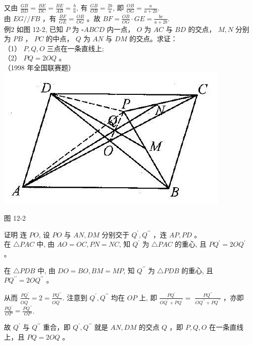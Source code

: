 \documentclass[10pt]{article}
\begin{document}
又由 $\frac{G B}{B D}=\frac{B E}{D C}=\frac{B E}{A B}=\frac{b}{a}$, 有 $\frac{G B}{O B}=\frac{2 b}{a}$, 即 $\frac{O B}{O G}=\frac{a}{a+2 b}$.\\
由 $E G / / F B$ ，有 $\frac{B F}{G E}=\frac{O B}{O G}$ 。故 $B F=\frac{O B}{O G} \cdot G E=\frac{b c}{a+2 b}$.\\
例2 如图 12-2, 已知 $P$ 为 $\square A B C D$ 内一点， $O$ 为 $A C$ 与 $B D$ 的交点， $M, N$ 分别为 $P B$ ， $P C$ 的中点， $Q$ 为 $A N$ 与 $D M$ 的交点。求证：\\
（1） $P, Q, O$ 三点在一条直线上;\\
（2） $P Q=2 O Q$ 。\\
（1998 年全国联赛题）\\
\includegraphics[max width=\textwidth, center]{2024_10_30_2c8f45efd4a519b08e1ag-110}

图 12-2

证明 连 $P O$, 设 $P O$ 与 $A N, D M$ 分别交于 $Q^{\prime}, Q^{\prime \prime}$ ，连 $A P, P D$ 。\\
在 $\triangle P A C$ 中, 由 $A O=O C, P N=N C$, 知 $Q^{\prime}$ 为 $\triangle P A C$ 的重心, 且 $P Q^{\prime}=2 O Q^{\prime}$ 。

在 $\triangle P D B$ 中, 由 $D O=B O, B M=M P$, 知 $Q^{\prime \prime}$ 为 $\triangle P D B$ 的重心, 且 $P Q^{\prime \prime}=2 O Q^{\prime \prime}$ 。

从而 $\frac{P Q^{\prime}}{O Q^{\prime}}=2=\frac{P Q^{\prime \prime}}{O Q^{\prime \prime}}$. 注意到 $Q^{\prime}, Q^{\prime \prime}$ 均在 $O P$ 上, 即 $\frac{P Q^{\prime}}{O Q^{\prime}+P Q^{\prime}}=$ $\frac{P Q^{\prime \prime}}{O Q^{\prime \prime}+P Q^{\prime \prime}}$ ，亦即 $\frac{P Q^{\prime}}{O P}=\frac{P Q^{\prime \prime}}{O P}$.

故 $Q^{\prime}$ 与 $Q^{\prime \prime}$ 重合，即 $Q^{\prime}, Q^{\prime \prime}$ 就是 $A N, D M$ 的交点 $Q$ ，即 $P, Q, O$ 在一条直线上，且 $P Q=2 O Q$ 。
\end{document}
